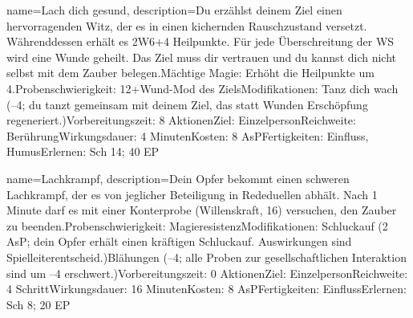 {
    name={Lach dich gesund},
    description={Du erzählst deinem Ziel einen hervorragenden Witz, der es in einen kichernden Rauschzustand versetzt. Währenddessen erhält es 2W6+4 Heilpunkte. Für jede Überschreitung der WS wird eine Wunde geheilt. Das Ziel muss dir vertrauen und du kannst dich nicht selbst mit dem Zauber belegen.\newline Mächtige Magie: Erhöht die Heilpunkte um 4.\newline Probenschwierigkeit: 12+Wund-Mod des Ziels\newline Modifikationen: Tanz dich wach (–4; du tanzt gemeinsam mit deinem Ziel, das statt Wunden Erschöpfung regeneriert.)\newline Vorbereitungszeit: 8 Aktionen\newline Ziel: Einzelperson\newline Reichweite: Berührung\newline Wirkungsdauer: 4 Minuten\newline Kosten: 8 AsP\newline Fertigkeiten: Einfluss, Humus\newline Erlernen: Sch 14; 40 EP}
}


{
    name={Lachkrampf},
    description={Dein Opfer bekommt einen schweren Lachkrampf, der es von jeglicher Beteiligung in Rededuellen abhält. Nach 1 Minute darf es mit einer Konterprobe (Willenskraft, 16) versuchen, den Zauber zu beenden.\newline Probenschwierigkeit: Magieresistenz\newline Modifikationen: Schluckauf (2 AsP; dein Opfer erhält einen kräftigen Schluckauf. Auswirkungen sind Spielleiterentscheid.)\newline Blähungen (–4; alle Proben zur gesellschaftlichen Interaktion sind um –4 erschwert.)\newline Vorbereitungszeit: 0 Aktionen\newline Ziel: Einzelperson\newline Reichweite: 4 Schritt\newline Wirkungsdauer: 16 Minuten\newline Kosten: 8 AsP\newline Fertigkeiten: Einfluss\newline Erlernen: Sch 8; 20 EP}
}


